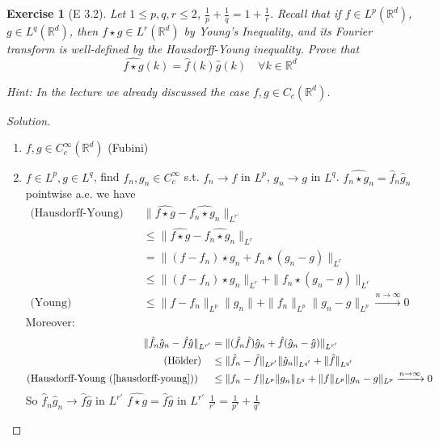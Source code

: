 \documentclass{report}
\theoremstyle{tommy}
\newtheorem{ex}[defn]{Exercise}
\begin{document}
  \begin{ex}[E 3.2]
    Let \(1 \le p, q, r \le 2\), \(\frac{1}{p} + \frac{1}{q} = 1 + \frac{1}{r}\). Recall that if \(f \in L^p(\mathbb{R}^d)\), \(g \in L^q(\mathbb{R}^d)\), then \(f \star g \in L^r(\mathbb{R}^d)\) by Young's Inequality, and its Fourier transform is well-defined by the Hausdorff-Young inequality. Prove that 
    \[\widehat{f \star g}(k) = \hat f(k) \hat g(k) \quad \forall k \in \mathbb{R}^d\]

    Hint: In the lecture we already discussed the case \(f, g \in C_c(\mathbb{R}^d)\).
  \end{ex}

  \begin{proof}[Solution] \
    \begin{enumerate}[label=Step \arabic*)]
      \item \(f, g \in C_c^\infty(\mathbb{R}^d)\) (Fubini)
      \item \(f \in L^p, g \in L^q\), find \(f_n, g_n \in C_c^\infty\) s.t. \(f_n \to f\) in \(L^p\), \(g_n \to g\) in \(L^q\). \(\widehat{f_n \star g_n} = \hat f_n \hat g_n\) pointwise a.e. we have
      \begin{align*}
        \text{(Hausdorff-Young)} \quad &\|\widehat{f \star g} - \widehat{f_n \star g_n}\|_{L^{r'}} \\
        &\le \|\widehat{f \star g} - \widehat{f_n \star g_n}\|_{L^r} \\
        &= \|(f - f_n) \star g_n + f_n \star (g_n - g) \|_{L^r} \\
        &\le \| (f-f_n) \star g_n \|_{L^r} + \| f_n \star (g_n - g)\|_{L^r} \\
        \text{(Young)} &\le \|f - f_n\|_{L^p} \|g_n\| + \|f_n\|_{L^p} \|g_n - g\|_{L^p} \xrightarrow{n \to \infty} 0
      \end{align*}
      Moreover:
      \begin{align*}
        \|\hat f_n \hat g_n - \hat f \hat g \|_{L^{r'}} 
        &= \|(\hat f_n \hat f)\hat g_n + \hat f (\hat g_n - \hat g) \|_{L^{r'}} \\
        \text{(Hölder)} \quad &\le \|\hat f_n - \hat f \|_{L^{p'}} \| \hat g_n \|_{L^{q'}} + \| \hat f \|_{L^{q'}} \\
        \text{(Hausdorff-Young (\ref{hausdorff-young}))} \quad &\le \| f_n - f \|_{L^p}\|g_n\|_{L^q} + \|f\|_{L^p} \|g_n - g\|_{L^p} \xrightarrow{n \to \infty} 0
      \end{align*}
      So \(\hat f_n \hat g_n \to \hat f \hat g \text{ in } L^{r'}\)
      \(\widehat{f \star g} = \hat f \hat g\) in \(L^{r'}\)
      \(\frac{1}{r'} = \frac{1}{p'} + \frac{1}{q'}\) \qedhere
    \end{enumerate}
  \end{proof}
\end{document}
